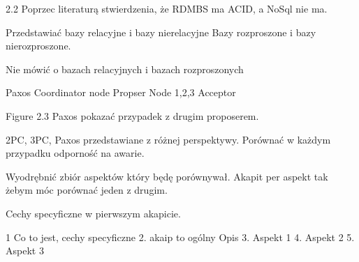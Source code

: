 2.2
Poprzec literaturą stwierdzenia, że RDMBS ma ACID, a NoSql nie ma.

Przedstawiać bazy relacyjne i bazy nierelacyjne
Bazy rozproszone i bazy nierozproszone.

Nie mówić o bazach relacyjnych i bazach rozproszonych

Paxos
Coordinator node Propser
Node 1,2,3 Acceptor

Figure 2.3 Paxos pokazać przypadek z drugim proposerem.

2PC, 3PC, Paxos przedstawiane z różnej perspektywy.
Porównać w każdym przypadku odporność na awarie.

Wyodrębnić zbiór aspektów który będę porównywał. 
Akapit per aspekt tak żebym móc porównać jeden z drugim.

Cechy specyficzne w pierwszym akapicie.

1 Co to jest, cechy specyficzne
2. akaip to ogólny Opis
3. Aspekt 1
4. Aspekt 2
5. Aspekt 3



